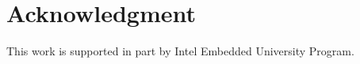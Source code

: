 \section{Acknowledgment}
\label{sec_ack}

This work is supported in part by Intel Embedded University Program.